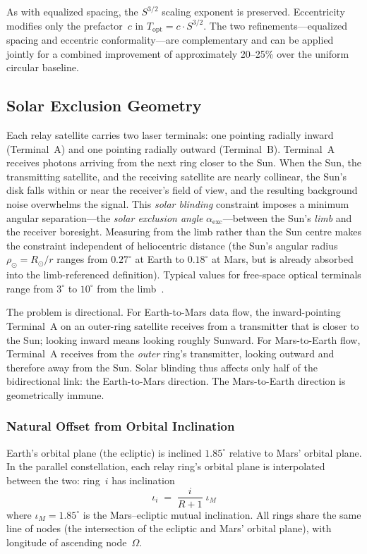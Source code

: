 As with equalized spacing, the $S^{3/2}$ scaling exponent is preserved.
Eccentricity modifies only the prefactor~$c$ in $T_{\mathrm{opt}} = c \cdot S^{3/2}$.
The two refinements---equalized spacing and eccentric conformality---are
complementary and can be applied jointly for a combined improvement of
approximately 20--25\% over the uniform circular baseline.


\subsection{Solar Exclusion Geometry}
\label{sec:solar-blinding}

Each relay satellite carries two laser terminals: one pointing radially inward
(Terminal~A) and one pointing radially outward (Terminal~B). Terminal~A receives
photons arriving from the next ring closer to the Sun. When the Sun, the
transmitting satellite, and the receiving satellite are nearly collinear, the
Sun's disk falls within or near the receiver's field of view, and the resulting
background noise overwhelms the signal. This \emph{solar blinding} constraint
imposes a minimum angular separation---the \emph{solar exclusion angle}
$\alpha_{\mathrm{exc}}$---between the Sun's \emph{limb} and the receiver
boresight. Measuring from the limb rather than the Sun centre makes the
constraint independent of heliocentric distance (the Sun's angular radius
$\rho_\odot = R_\odot / r$ ranges from $0.27^\circ$ at Earth to $0.18^\circ$
at Mars, but is already absorbed into the limb-referenced definition).
Typical values for free-space optical terminals range from
$3^\circ$ to $10^\circ$ from the limb~\cite{illuma-t2024}.

The problem is directional. For Earth-to-Mars data flow, the inward-pointing
Terminal~A on an outer-ring satellite receives from a transmitter that is closer
to the Sun; looking inward means looking roughly Sunward. For Mars-to-Earth flow,
Terminal~A receives from the \emph{outer} ring's transmitter, looking outward and
therefore away from the Sun. Solar blinding thus affects only half of the
bidirectional link: the Earth-to-Mars direction. The Mars-to-Earth direction is
geometrically immune.

\subsubsection{Natural Offset from Orbital Inclination}

Earth's orbital plane (the ecliptic) is inclined $1.85^\circ$ relative to Mars'
orbital plane. In the parallel constellation, each relay ring's orbital plane is
interpolated between the two: ring~$i$ has inclination
%
\begin{equation}
  \iota_i \;=\; \frac{i}{R+1}\;\iota_M
\end{equation}
%
where $\iota_M = 1.85^\circ$ is the Mars--ecliptic mutual inclination.
All rings share the same line of nodes (the intersection of the ecliptic and Mars'
orbital plane), with longitude of ascending node~$\Omega$.

